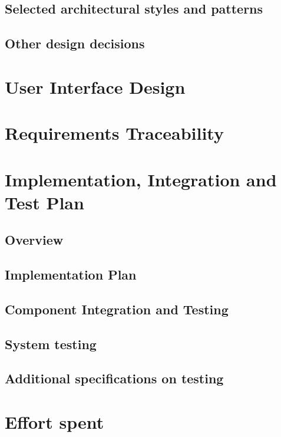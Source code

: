 \documentclass[a4paper,oneside,11pt]{article}
\begin{document}
        \subsection{Selected architectural styles and patterns}
            
        \subsection{Other design decisions}
            

    \newpage
    \section{User Interface Design}
        

    \newpage
    \section{Requirements Traceability}
        

    \newpage
    \section{Implementation, Integration and Test Plan}
        \subsection{Overview}
            
        \subsection{Implementation Plan}
            
        \subsection{Component Integration and Testing}
            
        \subsection{System testing}
            
        \subsection{Additional specifications on testing}
            

    \newpage
    \section{Effort spent}
        

    \newpage
    
    
            
\end{document}
